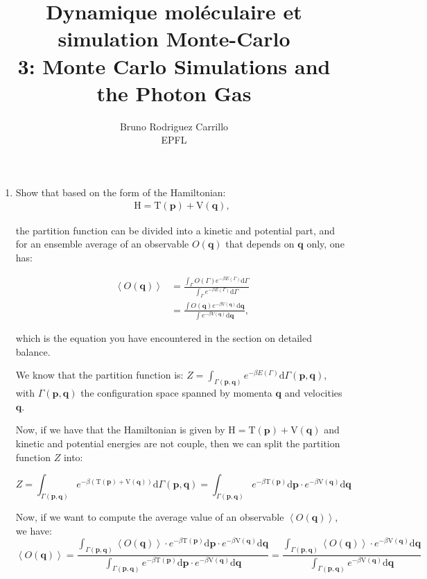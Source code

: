 \documentclass[12pt,letterpaper]{report}
\title{ Dynamique moléculaire et simulation Monte-Carlo \\ 3: Monte Carlo Simulations and the Photon Gas}
\author{Bruno Rodriguez Carrillo \\ EPFL}
\begin{document}
	
	\maketitle
	
	\begin{enumerate}
		\item 
		Show that based on the form of the Hamiltonian: 
		$$
		\begin{aligned}
		\mathrm{H} = \mathrm{T}(\mathbf{p}) + \mathrm{V}(\mathbf{q}),
		\end{aligned}
		$$
		
		the partition function can be divided into a kinetic and potential
		part, and for an ensemble average of an observable $O(\mathbf{q})$
		that depends on $\mathbf{q}$ only, one has: 
		
		$$
		\begin{aligned}
		\left<O(\mathbf{q})\right> &= \frac{\int_\Gamma O(\Gamma)e^{-\beta E(\Gamma)} \mathrm{d}\Gamma}{\int_\Gamma e^{-\beta E(\Gamma)} \mathrm{d}\Gamma} \\
		&= \frac{\int O(\mathbf{q})e^{-\beta V(\mathbf{q})} \mathrm{d}\mathbf{q}}{\int e^{-\beta V(\mathbf{q})} \mathrm{d}\mathbf{q}},
		\end{aligned}
		$$
		
		which is the equation you have encountered in the section on detailed balance.
		
		We know that the partition function is: $Z = \int_{\Gamma(\mathbf{p}, \mathbf{q})} e^{-\beta E(\Gamma)} \mathrm{d}\Gamma(\mathbf{p}, \mathbf{q})$, with $\Gamma(\mathbf{p}, \mathbf{q})$ the configuration space spanned by momenta $\mathbf{q}$ and velocities $\mathbf{q}$.
		
		Now, if we have that the Hamiltonian is given by $\mathrm{H} = \mathrm{T}(\mathbf{p}) + \mathrm{V}(\mathbf{q})$ and kinetic and potential energies are not couple, then we can split the partition function $Z$ into: 
		
		$$
		Z = \int_{\Gamma(\mathbf{p}, \mathbf{q})} e^{-\beta ( \mathrm{T}(\mathbf{p}) + \mathrm{V}(\mathbf{q}) )  } \mathrm{d}\Gamma(\mathbf{p}, \mathbf{q}) = 
		\int_{\Gamma(\mathbf{p}, \mathbf{q})} e^{-\beta \mathrm{T}(\mathbf{p})  } \mathrm{d}\mathbf{p}
		\cdot
		e^{-\beta \mathrm{V}(\mathbf{q} ) } \mathrm{d} \mathbf{q}
		$$
		
		Now, if we want to compute the average value of an observable $\left<O(\mathbf{q})\right>$, we have: 
		$$
		\left<O(\mathbf{q})\right> = 
		\dfrac
		{			
			\int_{\Gamma(\mathbf{p}, \mathbf{q})} \left<O(\mathbf{q})\right> \cdot  e^{-\beta \mathrm{T}(\mathbf{p})  } \mathrm{d}\mathbf{p}
			\cdot
			e^{-\beta \mathrm{V}(\mathbf{q} ) } \mathrm{d} \mathbf{q}
		}
		{
			\int_{\Gamma(\mathbf{p}, \mathbf{q})} e^{-\beta \mathrm{T}(\mathbf{p})  } \mathrm{d}\mathbf{p}
			\cdot
			e^{-\beta \mathrm{V}(\mathbf{q} ) } \mathrm{d} \mathbf{q}
		} 
		= 
		\dfrac
		{			
			\int_{\Gamma(\mathbf{p}, \mathbf{q})} \left<O(\mathbf{q})\right>
			\cdot
			e^{-\beta \mathrm{V}(\mathbf{q} ) } \mathrm{d} \mathbf{q}
		}
		{
			\int_{\Gamma(\mathbf{p}, \mathbf{q})} 
			e^{-\beta \mathrm{V}(\mathbf{q} ) } \mathrm{d} \mathbf{q}
		} 		
		$$
		

\end{enumerate}
\end{document}
